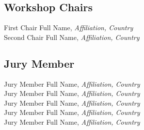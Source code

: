 
\subsection{Workshop Chairs}
First Chair Full Name, \emph{Affiliation, Country}\\
Second Chair Full Name, \emph{Affiliation, Country}\\


\subsection{Jury Member}
Jury Member Full Name, \emph{Affiliation, Country}\\
Jury Member Full Name, \emph{Affiliation, Country}\\
Jury Member Full Name, \emph{Affiliation, Country}\\
Jury Member Full Name, \emph{Affiliation, Country}\\
Jury Member Full Name, \emph{Affiliation, Country}\\
